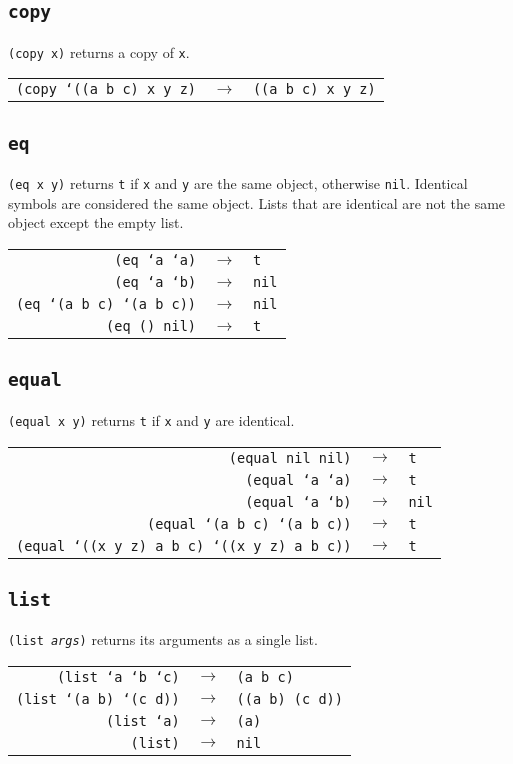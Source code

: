 \documentclass[12pt]{article}
\begin{document}
\subsection*{\texttt{copy}}
\texttt{(copy x)} returns a copy of \texttt{x}.
\begin{center}
\begin{tabular}{rcl}
\texttt{(copy `((a b c) x y z)} & $\to$ & \texttt{((a b c) x y z)} \\
\end{tabular}
\end{center}
\subsection*{\texttt{eq}}
\texttt{(eq x y)} returns \texttt{t} if \texttt{x} and \texttt{y} are the same object, otherwise \texttt{nil}.
Identical symbols are considered the same object. Lists that are identical are not the same object except the empty list.
\begin{center}
\begin{tabular}{rcl}
\texttt{(eq `a `a)} & $\to$ & \texttt{t} \\
\texttt{(eq `a `b)} & $\to$ & \texttt{nil} \\
\texttt{(eq `(a b c) `(a b c))} & $\to$ & \texttt{nil} \\
\texttt{(eq () nil)} & $\to$ & \texttt{t}
\end{tabular}
\end{center}
\subsection*{\texttt{equal}}
\texttt{(equal x y)} returns \texttt{t} if \texttt{x} and \texttt{y} are identical.
\begin{center}
\begin{tabular}{rcl}
\texttt{(equal nil nil)} & $\to$ & \texttt{t} \\
\texttt{(equal `a `a)} & $\to$ & \texttt{t} \\
\texttt{(equal `a `b)} & $\to$ & \texttt{nil} \\
\texttt{(equal `(a b c) `(a b c))} & $\to$ & \texttt{t} \\
\texttt{(equal `((x y z) a b c) `((x y z) a b c))} & $\to$ & \texttt{t} \\
\end{tabular}
\end{center}
\subsection*{\texttt{list}}
\texttt{(list \emph{args})} returns its arguments as a single list.
\begin{center}
\begin{tabular}{rcl}
\texttt{(list `a `b `c)} & $\to$ & \texttt{(a b c)} \\
\texttt{(list `(a b) `(c d))} & $\to$ & \texttt{((a b) (c d))} \\
\texttt{(list `a)} & $\to$ & \texttt{(a)} \\
\texttt{(list)} & $\to$ & \texttt{nil} 
\end{tabular}
\end{center}
\end{document}
